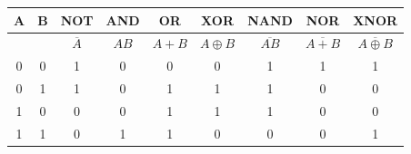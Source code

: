 \documentclass[a4paper]{article}
\begin{document}
\begin{multicols*}{2}
  \begin{tabular}{|c|c|c|c|c|c|c|c|c|}
    \hline
    A & B & NOT                                         & AND                                         & OR                                         & XOR                                         & NAND                                         & NOR                                         & XNOR                                         \\ \hline
      &   & $\overline{A}$                              & $AB$                                        & $A+B$                                      & $A \oplus B$                                & $\overline{AB}$                              & $\overline{A+B}$                            & $\overline{A \oplus B}$                      \\ \hline
    0 & 0 & 1                                           & 0                                           & 0                                          & 0                                           & 1                                            & 1                                           & 1                                            \\ \hline
    0 & 1 & 1                                           & 0                                           & 1                                          & 1                                           & 1                                            & 0                                           & 0                                            \\ \hline
    1 & 0 & 0                                           & 0                                           & 1                                          & 1                                           & 1                                            & 0                                           & 0                                            \\ \hline
    1 & 1 & 0                                           & 1                                           & 1                                          & 0                                           & 0                                            & 0                                           & 1                                            \\ \hline

\end{tabular}
\end{multicols*}
\end{document}

